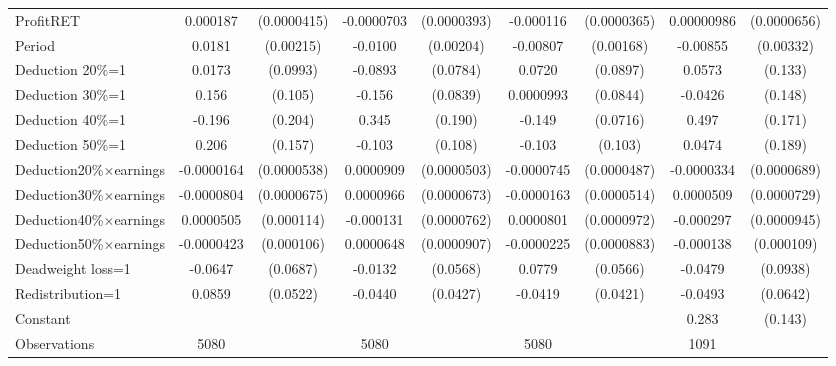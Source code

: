 \begin{tabular}{l|cccccc|cc}
\hline
ProfitRET       & 0.000187\sym{***}&(0.0000415)&-0.0000703\sym{*}  &(0.0000393)&-0.000116\sym{***}&(0.0000365)&0.00000986         &(0.0000656)\\
Period          &   0.0181\sym{***}&(0.00215)&  -0.0100\sym{***}&(0.00204)& -0.00807\sym{***}&(0.00168)& -0.00855\sym{**} &(0.00332)\\
Deduction 20\%=1&   0.0173         & (0.0993)&  -0.0893         & (0.0784)&   0.0720         & (0.0897)&   0.0573         &  (0.133)\\
Deduction 30\%=1&    0.156         &  (0.105)&   -0.156\sym{*}  & (0.0839)&0.0000993         & (0.0844)&  -0.0426         &  (0.148)\\
Deduction 40\%=1&   -0.196         &  (0.204)&    0.345\sym{*}  &  (0.190)&   -0.149\sym{**} & (0.0716)&    0.497\sym{***}&  (0.171)\\
Deduction 50\%=1&    0.206         &  (0.157)&   -0.103         &  (0.108)&   -0.103         &  (0.103)&   0.0474         &  (0.189)\\
Deduction\space{}20\%$\times$\space{}earnings&-0.0000164         &(0.0000538)&0.0000909\sym{*}  &(0.0000503)&-0.0000745         &(0.0000487)&-0.0000334         &(0.0000689)\\
Deduction\space{}30\%$\times$\space{}earnings&-0.0000804         &(0.0000675)&0.0000966         &(0.0000673)&-0.0000163         &(0.0000514)&0.0000509         &(0.0000729)\\
Deduction\space{}40\%$\times$\space{}earnings&0.0000505         &(0.000114)&-0.000131\sym{*}  &(0.0000762)&0.0000801         &(0.0000972)&-0.000297\sym{***}&(0.0000945)\\
Deduction\space{}50\%$\times$\space{}earnings&-0.0000423         &(0.000106)&0.0000648         &(0.0000907)&-0.0000225         &(0.0000883)&-0.000138         &(0.000109)\\
Deadweight loss=1&  -0.0647         & (0.0687)&  -0.0132         & (0.0568)&   0.0779         & (0.0566)&  -0.0479         & (0.0938)\\
Redistribution=1&   0.0859         & (0.0522)&  -0.0440         & (0.0427)&  -0.0419         & (0.0421)&  -0.0493         & (0.0642)\\
Constant        &                  &         &                  &         &                  &         &    0.283\sym{**} &  (0.143)\\
\hline
Observations    &     5080         &         &     5080         &         &     5080         &         &     1091         &         \\

\end{tabular}
